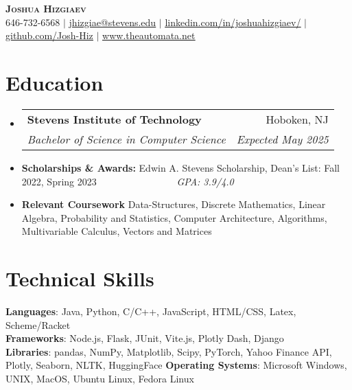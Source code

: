 \documentclass[letterpaper,11pt]{article}
\makeatletter
\newcommand{\resumeItem}[1]{
  \item\small{
    {#1 \vspace{-2pt}}
  }
}
\newcommand{\resumeSubheading}[4]{
  \vspace{-2pt}\item
    \begin{tabular*}{0.97\textwidth}[t]{l@{\extracolsep{\fill}}r}
      \textbf{#1} & #2 \\
      \textit{\small#3} & \textit{\small #4} \\
    \end{tabular*}\vspace{-7pt}
}
\newcommand{\resumeSubItem}[1]{\resumeItem{#1}\vspace{-4pt}}
\newcommand{\resumeSubHeadingListStart}{\begin{itemize}[leftmargin=0.15in, label={}]}
\newcommand{\resumeSubHeadingListEnd}{\end{itemize}}
\makeatother
\begin{document}

\begin{center}
    \textbf{\Huge \scshape Joshua Hizgiaev} \\ \vspace{1pt}
    \small 646-732-6568 $|$ \href{mailto:jhizgiae@stevens.edu}{\underline{jhizgiae@stevens.edu}} $|$ 
    \href{https://linkedin.com/in/joshuahizgiaev/}{\underline{linkedin.com/in/joshuahizgiaev/}} $|$
    \href{https://github.com/Josh-Hiz}{\underline{github.com/Josh-Hiz}} $|$
    \href{https://www.theautomata.net/}{\underline{www.theautomata.net}}
\end{center}


\section{Education}
  \resumeSubHeadingListStart
    \resumeSubheading
      {Stevens Institute of Technology}{Hoboken, NJ}
      {Bachelor of Science in Computer Science}{Expected May 2025}
    \resumeSubItem{\textbf{Scholarships \& Awards: }Edwin A. Stevens Scholarship, Dean's List: Fall 2022, Spring 2023 \ \ \ \ \ \ \ \ \ \ \ \ \ \ \ \ \textit{GPA: 3.9/4.0}}
    \resumeSubItem{\textbf{Relevant Coursework }Data-Structures, Discrete Mathematics, Linear Algebra, Probability and Statistics, Computer Architecture, Algorithms, Multivariable Calculus, Vectors and Matrices}
  \resumeSubHeadingListEnd

%
\section{Technical Skills}
 \begin{itemize}[leftmargin=0.15in, label={}]
    \small{\item{
     \textbf{Languages}{: Java, Python, C/C++, JavaScript, HTML/CSS, Latex, Scheme/Racket} \\
     \textbf{Frameworks}{: Node.js, Flask, JUnit, Vite.js, Plotly Dash, Django} \\
     \textbf{Libraries}{: pandas, NumPy, Matplotlib, Scipy, PyTorch, Yahoo Finance API, Plotly, Seaborn, NLTK, HuggingFace}
     \textbf{Operating Systems}{: Microsoft Windows, UNIX, MacOS, Ubuntu Linux, Fedora Linux}
    }}
 \end{itemize}
\end{document}
